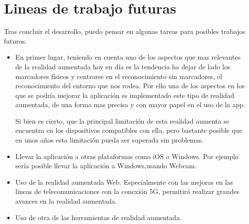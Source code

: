 \section{Lineas de trabajo futuras}
Tras concluir el desarrollo, puedo pensar en algunas tareas para posibles trabajos futuros.
\begin{itemize}
	\item En primer lugar, teniendo en cuenta uno de los aspectos que mas relevantes de la realidad aumentada hoy en día es la tendencia ha dejar de lado los marcadores físicos y centrarse en el reconocimiento sin marcadores, el reconocimiento del entorno que nos rodea.
	Por ello una de los aspectos en los que se podría mejorar la aplicación es implementado este tipo de realidad aumentada, de una forma mas precisa y con mayor papel en el uso de la app.
	
	Si bien es cierto, que la principal limitación de esta realidad aumenta se encuentra en los dispositivos compatibles con ella, pero bastante posible que en unos años esta limitación pueda ser superada sin problemas.
	\item Llevar la aplicación a otras plataformas como iOS o Windows. Por ejemplo sería posible llevar la aplicación a Windows,usando Webcam.
	\item Uso de la realidad aumentada Web. Especialmente con las mejoras en las lineas de telecomunicaciones con la conexión 5G, permitirá realizar grandes avances en la realidad aumentada.
	\item Uso de otra de las herramientas de realidad aumentada.
	
\end{itemize}

